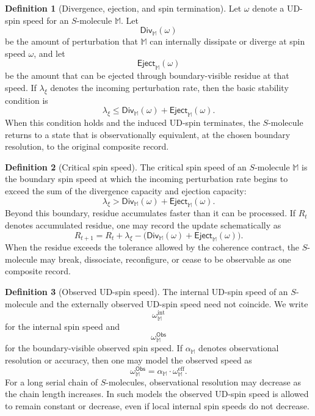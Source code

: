 \documentclass[11pt]{article}
\newcommand{\Obs}{\mathsf{Obs}}
\theoremstyle{definition}
\newtheorem{definition}{Definition}[section]
\theoremstyle{plain}
\begin{document}
\begin{definition}[Divergence, ejection, and spin termination]
Let \(\omega\) denote a UD-spin speed for an \(S\)-molecule \(\mathbb M\).
Let
\[
  \mathsf{Div}_{\mathbb M}(\omega)
\]
be the amount of perturbation that \(\mathbb M\) can internally dissipate
or diverge at spin speed \(\omega\), and let
\[
  \mathsf{Eject}_{\mathbb M}(\omega)
\]
be the amount that can be ejected through boundary-visible residue at
that speed.  If \(\lambda_\xi\) denotes the incoming perturbation rate,
then the basic stability condition is
\[
  \lambda_\xi
  \leq
  \mathsf{Div}_{\mathbb M}(\omega)
  +
  \mathsf{Eject}_{\mathbb M}(\omega).
\]
When this condition holds and the induced UD-spin terminates, the
\(S\)-molecule returns to a state that is observationally equivalent, at
the chosen boundary resolution, to the original composite record.
\end{definition}

\begin{definition}[Critical spin speed]
The critical spin speed of an \(S\)-molecule \(\mathbb M\) is the boundary
spin speed at which the incoming perturbation rate begins to exceed the
sum of the divergence capacity and ejection capacity:
\[
  \lambda_\xi
  >
  \mathsf{Div}_{\mathbb M}(\omega)
  +
  \mathsf{Eject}_{\mathbb M}(\omega).
\]
Beyond this boundary, residue accumulates faster than it can be processed.
If \(R_t\) denotes accumulated residue, one may record the update
schematically as
\[
  R_{t+1}
  =
  R_t
  +
  \lambda_\xi
  -
  \bigl(
    \mathsf{Div}_{\mathbb M}(\omega)
    +
    \mathsf{Eject}_{\mathbb M}(\omega)
  \bigr).
\]
When the residue exceeds the tolerance allowed by the coherence contract,
the \(S\)-molecule may break, dissociate, reconfigure, or cease to be
observable as one composite record.
\end{definition}

\begin{definition}[Observed UD-spin speed]
The internal UD-spin speed of an \(S\)-molecule and the externally
observed UD-spin speed need not coincide.  We write
\[
  \omega^{\mathrm{int}}_{\mathbb M}
\]
for the internal spin speed and
\[
  \omega^{\Obs}_{\mathbb M}
\]
for the boundary-visible observed spin speed.  If
\(\alpha_{\mathbb M}\) denotes observational resolution or accuracy, then
one may model the observed speed as
\[
  \omega^{\Obs}_{\mathbb M}
  =
  \alpha_{\mathbb M}\cdot \omega^{\mathrm{eff}}_{\mathbb M}.
\]
For a long serial chain of \(S\)-molecules, observational resolution may
decrease as the chain length increases.  In such models the observed
UD-spin speed is allowed to remain constant or decrease, even if local
internal spin speeds do not decrease.
\end{definition}
\end{document}

